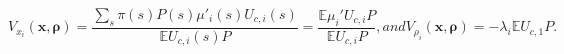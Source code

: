 \documentclass[thmsb,11pt]{article}
\begin{document}
\begin{subequations}
\begin{equation}
	V_{x_i}(\bm x,\bm \rho)= \frac{\sum_s\pi(s) P(s)\mu'_i(s) U_{c,i}(s)}{\mathbb E U_{c,i}(s)P} = \frac{\mathbb E\mu_i' U_{c,i}P}{\mathbb E U_{c,i}P}\label{eq.env_x},
\end{equation}and
\begin{equation}
	V_{\rho_i}(\bm x,\bm \rho) = -\lambda_i \mathbb E U_{c,1}P\label{eq.env_rho}.
 \end{equation}\end{subequations}

\end{document}
